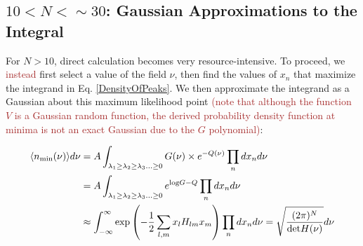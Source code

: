 \documentclass[12pt]{article}
\newcommand{\sh}[1]{\textcolor{brown}{#1}}
\begin{document}

\subsection{$10 < N < \sim30$: Gaussian Approximations to the Integral}
For $N>10$, direct calculation becomes very resource-intensive. To proceed, we \sh{instead} first select a value of the field $\nu$, then find the values of $x_n$ that maximize the integrand in Eq. \ref{DensityOfPeaks}. We then approximate the integrand as a Gaussian about this maximum likelihood point \sh{(note that although the function $V$ is a Gaussian random function, the derived probability density function at minima is not an exact Gaussian due to the $G$ polynomial)}:\

\begin{align*}
\begin{split}
\langle n_{\rm min}(\nu)\rangle d\nu &= A \int_{\lambda_1 \geq \lambda_2 \geq \lambda_3 \ldots \geq 0} G(\nu) \times e^{-Q(\nu)} \prod_n dx_n d\nu\\
&=A\int_{\lambda_1 \geq \lambda_2 \geq \lambda_3 \ldots \geq 0} e^{\mathrm{log}G-Q} \prod_n dx_n d\nu\\
&\approx \int_{-\infty}^{\infty} \exp\left(-\frac{1}{2}\sum_{l,m}x_lH_{lm}x_m\right)  \prod_n dx_n d\nu = \sqrt{\frac{(2\pi)^N}{\mathrm{det} H(\nu)}}d\nu
\end{split}
\end{align*}
\end{document}
